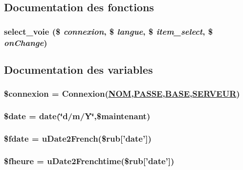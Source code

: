 \subsection{Documentation des fonctions}
\hypertarget{bolus_8php_a14}{
\subsubsection[select\_\-voie]{\setlength{\rightskip}{0pt plus 5cm}select\_\-voie (\$ {\em connexion}, \$ {\em langue}, \$ {\em item\_\-select}, \$ {\em on\-Change})}}
\label{bolus_8php_a14}




\subsection{Documentation des variables}
\hypertarget{bolus_8php_a0}{
\subsubsection[\$connexion]{\setlength{\rightskip}{0pt plus 5cm}\$connexion = Connexion(\hyperlink{pma__connect_8php_a0}{NOM},\hyperlink{pma__connect_8php_a1}{PASSE},\hyperlink{pma__connect_8php_a3}{BASE},\hyperlink{pma__connect_8php_a2}{SERVEUR})}}
\label{bolus_8php_a0}


\hypertarget{bolus_8php_a6}{
\subsubsection[\$date]{\setlength{\rightskip}{0pt plus 5cm}\$date = date(\char`\"{}d/m/Y\char`\"{},\$maintenant)}}
\label{bolus_8php_a6}


\hypertarget{bolus_8php_a12}{
\subsubsection[\$fdate]{\setlength{\rightskip}{0pt plus 5cm}\$fdate = u\-Date2French(\$rub\mbox{[}'date'\mbox{]})}}
\label{bolus_8php_a12}


\hypertarget{bolus_8php_a13}{
\subsubsection[\$fheure]{\setlength{\rightskip}{0pt plus 5cm}\$fheure = u\-Date2Frenchtime(\$rub\mbox{[}'date'\mbox{]})}}
\label{bolus_8php_a13}


